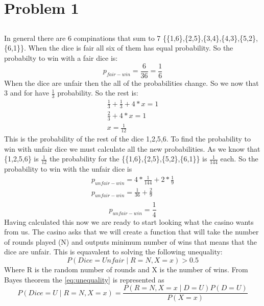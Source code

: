 \section{Problem 1}
\subsection{}
In general there are 6 compinations that sum to 7 
\{\{1,6\},\{2,5\},\{3,4\},\{4,3\},\{5,2\},\{6,1\}\}. 
When the dice is fair all six of them has equal probability. 
So the probabilty to win with a fair dice is:
\begin{equation}
p_{fair-win} = \frac{6}{36} = \frac{1}{6}
\end{equation}
When the dice are unfair then the all of the probabilities 
change. So we now that 3 and for have $\frac{1}{3}$ probability.
So the rest is:
\begin{align*}
\frac{1}{3} + \frac{1}{3} + 4*x = 1 \\
\frac{2}{3} + 4*x =1 \\
x = \frac{1}{12}
\end{align*}
This is the probability of the rest of the dice {1,2,5,6}.
To find the probability to win with unfair dice we must 
calculate all the new probabilities. As we know that 
\{1,2,5,6\} is $\frac{1}{12}$ the probability for the 
\{\{1,6\},\{2,5\},\{5,2\},\{6,1\}\} is $\frac{1}{144}$ each.
So the probability to win with the unfair dice is 
\begin{align*}
p_{unfair-win} = 4*\frac{1}{144} + 2*\frac{1}{9} \\
p_{unfair-win} = \frac{1}{36} + \frac{2}{9} \\
\end{align*}
\begin{equation}
p_{unfair-win} = \frac{1}{4}
\end{equation}
Having calculated this now we are ready to start looking what 
the casino wants from us. 
The casino asks that we will create a function that will take
the number of rounds played (N) and outputs minimum number of 
wins that means that the dice are unfair.
This is equavalent to solving the following unequality:
\begin{equation} \label{eq:unequality}
P(Dice=Unfair\mid R=N,X=x) >0.5
\end{equation}
Where R is the random number of rounds and X is the number of wins.
From Bayes theorem the \ref{eq:unequality} is represented as
\begin{equation}
P(Dice=U\mid R=N,X=x) = \frac{P(R=N,X=x\mid D=U)P(D=U)}{P(X=x)}
\end{equation}
